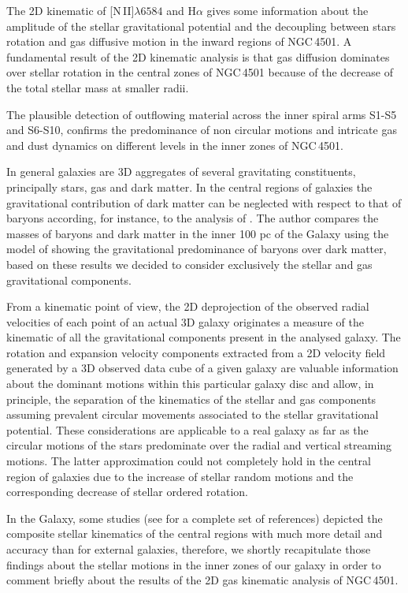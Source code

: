 \documentclass[fleqn,usenatbib]{mnras}
\begin{document}
The 2D kinematic of \hbox{[N\,II]$\lambda6584$} and H$\alpha$ gives some information about the amplitude of 
the stellar gravitational potential and the decoupling between stars rotation and gas diffusive motion in the 
inward regions of NGC\,4501. A fundamental result of the 2D kinematic analysis is that gas diffusion dominates 
over stellar rotation in the central zones of NGC\,4501 because of the decrease of the total stellar mass at 
smaller radii.

The plausible detection of outflowing material across the inner spiral arms S1-S5 and S6-S10, confirms the 
predominance of non circular motions and intricate gas and dust dynamics on different levels in the inner 
zones of NGC\,4501.

In general galaxies are 3D aggregates of several gravitating constituents, principally stars, gas
and dark matter. In the central regions of galaxies the gravitational contribution of dark matter can be neglected 
with respect to that of baryons according, for instance, to the analysis of \citet{Linden2014}. The author compares 
the masses of baryons and dark matter in the inner 100 pc of the Galaxy using the model of \citet{McMillan2011} showing 
the gravitational predominance of baryons over dark matter, based on these results we decided to consider exclusively the 
stellar and gas gravitational components.

From a kinematic point of view, the 2D deprojection of the observed radial velocities
of each point of an actual 3D galaxy originates a measure of the kinematic of all the gravitational 
components present in the analysed galaxy. The rotation and expansion velocity components extracted from a 2D velocity 
field generated by a 3D observed data cube of a given galaxy are valuable information about the dominant motions 
within this particular galaxy disc and allow, in principle, the separation of the kinematics of the stellar and gas components 
assuming prevalent circular movements associated to the stellar gravitational potential. These considerations are applicable 
to a real galaxy as far as the circular motions of the stars predominate over the radial and vertical streaming motions. The latter 
approximation could not completely hold in the central region of galaxies due to the increase of stellar random motions and the 
corresponding decrease of stellar ordered rotation.

In the Galaxy, some studies (see \citet{Genzel2010} for a complete set of references) depicted the composite stellar kinematics of the 
central regions with much more detail and accuracy than for external galaxies, therefore, we shortly recapitulate those findings 
about the stellar motions in the inner zones of our galaxy in order to comment briefly about the results of the 2D gas kinematic analysis 
of NGC\,4501.   
\end{document}
